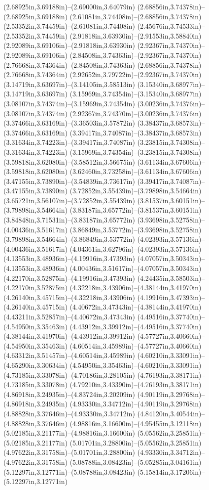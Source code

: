 (2.68925in,3.69188in)--(2.69000in,3.64079in) (2.68856in,3.74378in)--(2.68925in,3.69188in) (2.61081in,3.74408in)--(2.68856in,3.74378in) (2.53352in,3.74459in)--(2.61081in,3.74408in) (2.45676in,3.74533in)--(2.53352in,3.74459in) (2.91818in,3.63930in)--(2.91553in,3.58840in) (2.92089in,3.69106in)--(2.91818in,3.63930in) (2.92367in,3.74370in)--(2.92089in,3.69106in) (2.84508in,3.74363in)--(2.92367in,3.74370in) (2.76668in,3.74364in)--(2.84508in,3.74363in) (2.68856in,3.74378in)--(2.76668in,3.74364in) (2.92652in,3.79722in)--(2.92367in,3.74370in) (3.14719in,3.63697in)--(3.14105in,3.58513in) (3.15340in,3.68977in)--(3.14719in,3.63697in) (3.15969in,3.74354in)--(3.15340in,3.68977in) (3.08107in,3.74374in)--(3.15969in,3.74354in) (3.00236in,3.74376in)--(3.08107in,3.74374in) (2.92367in,3.74370in)--(3.00236in,3.74376in) (3.37466in,3.63169in)--(3.36503in,3.57872in) (3.38437in,3.68573in)--(3.37466in,3.63169in) (3.39417in,3.74087in)--(3.38437in,3.68573in) (3.31634in,3.74223in)--(3.39417in,3.74087in) (3.23815in,3.74308in)--(3.31634in,3.74223in) (3.15969in,3.74354in)--(3.23815in,3.74308in) (3.59818in,3.62080in)--(3.58512in,3.56675in) (3.61134in,3.67606in)--(3.59818in,3.62080in) (3.62460in,3.73258in)--(3.61134in,3.67606in) (3.47155in,3.73890in)--(3.54839in,3.73617in) (3.39417in,3.74087in)--(3.47155in,3.73890in) (3.72852in,3.55439in)--(3.79898in,3.54664in) (3.65721in,3.56107in)--(3.72852in,3.55439in) (3.81537in,3.60151in)--(3.79898in,3.54664in) (3.83187in,3.65772in)--(3.81537in,3.60151in) (3.84848in,3.71531in)--(3.83187in,3.65772in) (3.93698in,3.52758in)--(4.00436in,3.51617in) (3.86849in,3.53772in)--(3.93698in,3.52758in) (3.79898in,3.54664in)--(3.86849in,3.53772in) (4.02393in,3.57136in)--(4.00436in,3.51617in) (4.04361in,3.62796in)--(4.02393in,3.57136in) (4.13553in,3.48936in)--(4.19916in,3.47393in) (4.07057in,3.50343in)--(4.13553in,3.48936in) (4.00436in,3.51617in)--(4.07057in,3.50343in) (4.22170in,3.52875in)--(4.19916in,3.47393in) (4.24435in,3.58503in)--(4.22170in,3.52875in) (4.32218in,3.43906in)--(4.38144in,3.41970in) (4.26140in,3.45715in)--(4.32218in,3.43906in) (4.19916in,3.47393in)--(4.26140in,3.45715in) (4.40672in,3.47343in)--(4.38144in,3.41970in) (4.43211in,3.52857in)--(4.40672in,3.47343in) (4.49516in,3.37740in)--(4.54950in,3.35463in) (4.43912in,3.39912in)--(4.49516in,3.37740in) (4.38144in,3.41970in)--(4.43912in,3.39912in) (4.57727in,3.40660in)--(4.54950in,3.35463in) (4.60514in,3.45989in)--(4.57727in,3.40660in) (4.63312in,3.51457in)--(4.60514in,3.45989in) (4.60210in,3.33091in)--(4.65290in,3.30634in) (4.54950in,3.35463in)--(4.60210in,3.33091in) (4.73185in,3.33078in)--(4.70186in,3.28105in) (4.76193in,3.38171in)--(4.73185in,3.33078in) (4.79210in,3.43390in)--(4.76193in,3.38171in) (4.86918in,3.24935in)--(4.83724in,3.20209in) (4.90119in,3.29768in)--(4.86918in,3.24935in) (4.93330in,3.34712in)--(4.90119in,3.29768in) (4.88828in,3.37646in)--(4.93330in,3.34712in) (4.84120in,3.40544in)--(4.88828in,3.37646in) (4.98816in,3.16600in)--(4.95455in,3.12118in) (5.02185in,3.21177in)--(4.98816in,3.16600in) (5.05562in,3.25851in)--(5.02185in,3.21177in) (5.01701in,3.28800in)--(5.05562in,3.25851in) (4.97622in,3.31758in)--(5.01701in,3.28800in) (4.93330in,3.34712in)--(4.97622in,3.31758in) (5.08788in,3.08423in)--(5.05285in,3.04161in) (5.12297in,3.12771in)--(5.08788in,3.08423in) (5.15814in,3.17206in)--(5.12297in,3.12771in) 